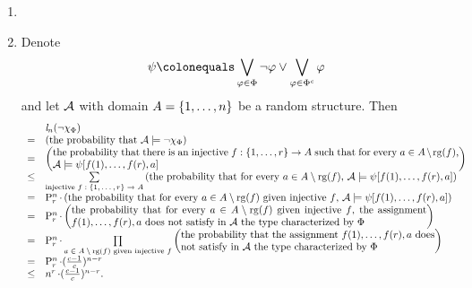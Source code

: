 \begin{enumerate}[1.]
%
\item {}
%
\item {} Denote
\[
\psi \defas \blor_{\varphi \in \Phi} \neg\varphi \lor \blor_{\varphi \in \cmpl{\Phi}} \varphi
\]
and let $\mathcal{A}$ with domain $A = {\{1, \ldots, n\}}$ be a random structure. Then
\[
\begin{array}{ll}
\    & \lprob[n](\neg\extaxm[\Phi]) \cr
=    & \paren{\mbox{the probability that \mathmode{\strct{A} \satis \neg\extaxm[\Phi]}}} \cr
=    & \paren{\parbox{40em}{the probability that there is an injective \mathmode{f : \sete{1, \etc, r} \to A} such that for every \mathmode{a \in A \setminus \rg(f)}, \mathmode{\strct{A} \satis \psi[f(1), \etc, f(r), a]}}} \cr
\leq & \sum\limits_{\text{injective \mathmode{f : \sete{1, \etc, r} \to A}}} \paren{\mbox{the probability that for every \mathmode{a \in A \setminus \rg(f)}, \mathmode{\strct{A} \satis \psi[f(1), \etc, f(r), a]}}} \cr
=    & \prmt{n}{r} \mul \paren{\mbox{the probability that for every \mathmode{a \in A \setminus \rg(f)} given injective \mathmode{f}, \mathmode{\strct{A} \satis \psi[f(1), \etc, f(r), a]}}} \cr
=    & \prmt{n}{r} \mul \paren{\parbox{35em}{the probability that for every \mathmode{a \in A \setminus \rg(f)} given injective \mathmode{f}, the assignment \mathmode{f(1), \etc, f(r), a} does not satisfy in \mathmode{\strct{A}} the type characterized by \mathmode{\Phi}}} \cr
=    & \prmt{n}{r} \mul \prod\limits_{\text{\mathmode{a \in A \setminus \rg(f)} given injective \mathmode{f}}} \paren{\parbox{25em}{the probability that the assignment \mathmode{f(1), \etc, f(r), a} does not satisfy in \mathmode{\strct{A}} the type characterized by \mathmode{\Phi}}} \cr
=    & \prmt{n}{r} \mul (\frac{c - 1}{c})^{n - r} \cr
\leq & n^r \mul (\frac{c - 1}{c})^{n - r}. \cr
\end{array}
\]


\end{enumerate}
